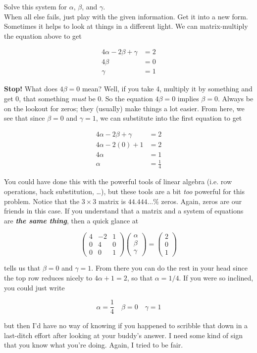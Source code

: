 \documentclass{article}
\def\a{\alpha}
\def\b{\beta}
\def\c{\gamma}
\begin{document}
Solve this system for $\a$, $\b$, and $\c$.\\

When all else fails, just play with the given information. Get it into a new form. Sometimes it helps to look at things in a different light. We can matrix-multiply the equation above to get


\begin{align*}
4 \a - 2 \b + \c &= 2 \\
4 \b &= 0 \\
\c & = 1
\end{align*}

\textbf{Stop!} What does $4 \b = 0$ mean? Well, if you take 4, multiply it by something and get 0, that something \textit{must} be 0. So the equation $4 \b = 0$ implies $\b = 0$. Always be on the lookout for zeros; they (usually) make things a lot easier. From here, we see that since $\b = 0$ and $\c = 1$, we can substitute into the first equation to get

\begin{align*}
4 \a - 2 \b + \c &= 2 \\
4 \a - 2 (0) + 1 &= 2 \\
4 \a &= 1 \\
\a &= \frac{1}{4}
\end{align*}

You could have done this with the powerful tools of linear algebra (i.e. row operations, back substitution, \dots ), but these tools are a bit \textit{too} powerful for this problem. Notice that the $3 \times 3$ matrix is $44.444\dots$\% zeros. Again, zeros are our friends in this case. If you understand that a matrix and a system of equations are \textit{\textbf{the same thing}}, then a quick glance at 

\[
\begin{pmatrix} 4 & -2 & 1 \\ 0 & 4 & 0 \\ 0 & 0 & 1 \end{pmatrix} \begin{pmatrix} \a \\ \b \\ \c \end{pmatrix} = \begin{pmatrix} 2 \\ 0 \\ 1 \end{pmatrix}
\]

{\setlength{\parindent}{0cm}
tells us that $\b = 0$ and $\c = 1$. From there you can do the rest in your head since the top row reduces nicely to $4 \a + 1 = 2$, so that $\a = 1/4$. If you were so inclined, you could just write
}

\[
\a = \frac{1}{4} \quad \b = 0 \quad \c = 1
\]

{\setlength{\parindent}{0cm}
but then I'd have no way of knowing if you happened to scribble that down in a last-ditch effort after looking at your buddy's answer. I need some kind of sign that you know what you're doing. Again, I tried to be fair. 
}
\end{document}
